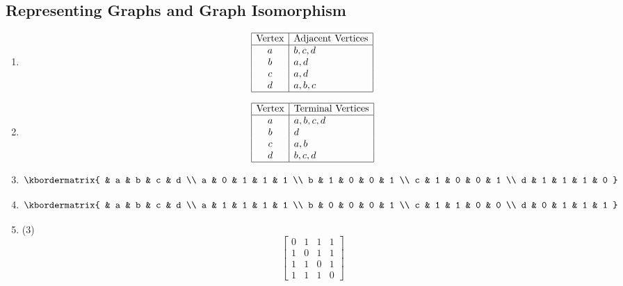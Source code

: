 \documentclass[12pt, A4]{article}
\newcommand{\enumset}[1]{\setcounter{enumi}{#1}}
\begin{document}
		\subsection{Representing Graphs and Graph Isomorphism}
			\begin{enumerate}
				\item
					\[\begin{array}{|c|l|}\hline
						\text{Vertex} & \text{Adjacent Vertices} \\\hline
						a & b, c, d \\
						b & a, d\\
						c & a, d \\
						d & a, b, c \\\hline
					\end{array}\]
				\enumset{2}
				\item
					\[\begin{array}{|c|l|}\hline
						\text{Vertex} & \text{Terminal Vertices} \\\hline
						a & a, b, c, d \\
						b & d \\
						c & a, b \\
						d & b, c, d \\\hline
					\end{array}\]
				\enumset{4}
				\item
					\[\kbordermatrix{
								& a & b & c & d \\
								a & 0 & 1 & 1 & 1 \\
								b & 1 & 0 & 0 & 1 \\
								c & 1 & 0 & 0 & 1 \\
								d & 1 & 1 & 1 & 0
					}\]
				\enumset{6}
				\item
					\[\kbordermatrix{
								& a & b & c & d \\
								a & 1 & 1 & 1 & 1 \\
								b & 0 & 0 & 0 & 1 \\
								c & 1 & 1 & 0 & 0 \\
								d & 0 & 1 & 1 & 1
					}\]
				\enumset{8}
				\item
					\begin{tasks}(3)
						\task
							\[\begin{bmatrix}
								0 & 1 & 1 & 1 \\
								1 & 0 & 1 & 1 \\
								1 & 1 & 0 & 1 \\
								1 & 1 & 1 & 0 
							\end{bmatrix}\]

\end{tasks}
\end{enumerate}
\end{document}
